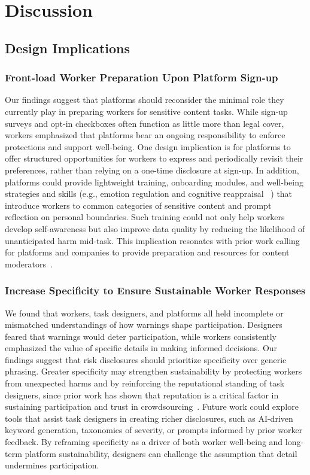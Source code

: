\section{Discussion}
\subsection{Design Implications}
\subsubsection{Front-load Worker Preparation Upon Platform Sign-up}
Our findings suggest that platforms should reconsider the minimal role they currently play in preparing workers for sensitive content tasks. While sign-up surveys and opt-in checkboxes often function as little more than legal cover, workers emphasized that platforms bear an ongoing responsibility to enforce protections and support well-being. One design implication is for platforms to offer structured opportunities for workers to express and periodically revisit their preferences, rather than relying on a one-time disclosure at sign-up. In addition, platforms could provide lightweight training, onboarding modules, and well-being strategies and skills (e.g., emotion regulation and cognitive reappraisal ~\cite{spence2023content}) that introduce workers to common categories of sensitive content and prompt reflection on personal boundaries. Such training could not only help workers develop self-awareness but also improve data quality by reducing the likelihood of unanticipated harm mid-task. This implication resonates with prior work calling for platforms and companies to provide preparation and resources for content moderators~\cite{qian2025aura, steiger_psychological_2021, steiger2022effects}. 


\subsubsection{Increase Specificity to Ensure Sustainable Worker Responses}
We found that workers, task designers, and platforms all held incomplete or mismatched understandings of how warnings shape participation. Designers feared that warnings would deter participation, while workers consistently emphasized the value of specific details in making informed decisions. Our findings suggest that risk disclosures should prioritize specificity over generic phrasing. Greater specificity may strengthen sustainability by protecting workers from unexpected harms and by reinforcing the reputational standing of task designers, since prior work has shown that reputation is a critical factor in sustaining participation and trust in crowdsourcing~\cite{gaikwad2016boomerang, irani2013turkopticon}. Future work could explore tools that assist task designers in creating richer disclosures, such as AI-driven keyword generation, taxonomies of severity, or prompts informed by prior worker feedback. By reframing specificity as a driver of both worker well-being and long-term platform sustainability, designers can challenge the assumption that detail undermines participation. 

